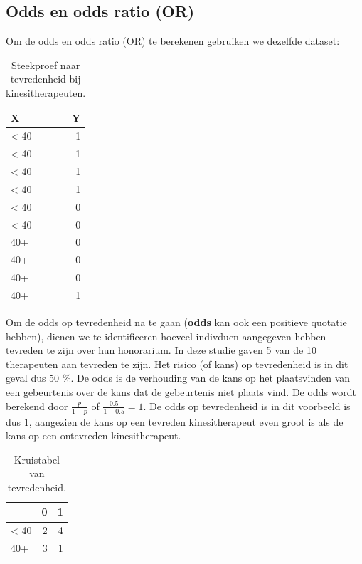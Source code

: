 \documentclass[
]{book}
\theoremstyle{definition}
\theoremstyle{definition}
\theoremstyle{definition}
\theoremstyle{definition}
\theoremstyle{remark}
\begin{document}
\hypertarget{odds-en-odds-ratio-or}{%
\subsection*{Odds en odds ratio (OR)}\label{odds-en-odds-ratio-or}}


Om de odds en odds ratio (OR) te berekenen gebruiken we dezelfde dataset:

\begin{table}

\caption{\label{tab:unnamed-chunk-17}Steekproef naar tevredenheid bij kinesitherapeuten.}
\centering
\begin{tabular}[t]{lr}
\toprule
X & Y\\
\midrule
< 40 & 1\\
< 40 & 1\\
< 40 & 1\\
< 40 & 1\\
< 40 & 0\\
\addlinespace
< 40 & 0\\
40+ & 0\\
40+ & 0\\
40+ & 0\\
40+ & 1\\
\bottomrule
\end{tabular}
\end{table}

Om de odds op tevredenheid na te gaan (\textbf{odds} kan ook een positieve quotatie hebben), dienen we te identificeren hoeveel indivduen aangegeven hebben tevreden te zijn over hun honorarium. In deze studie gaven 5 van de 10 therapeuten aan tevreden te zijn. Het risico (of kans) op tevredenheid is in dit geval dus 50 \(\%\). De odds is de verhouding van de kans op het plaatsvinden van een gebeurtenis over de kans dat de gebeurtenis niet plaats vind. De odds wordt berekend door \(\frac{p}{1-p}\) of \(\frac{0.5}{1-0.5} = 1\). De odds op tevredenheid is in dit voorbeeld is dus \(1\), aangezien de kans op een tevreden kinesitherapeut even groot is als de kans op een ontevreden kinesitherapeut.

\begin{table}

\caption{\label{tab:unnamed-chunk-18}Kruistabel van tevredenheid.}
\centering
\begin{tabular}[t]{lrr}
\toprule
  & 0 & 1\\
\midrule
< 40 & 2 & 4\\
40+ & 3 & 1\\
\bottomrule
\end{tabular}
\end{table}
\end{document}
